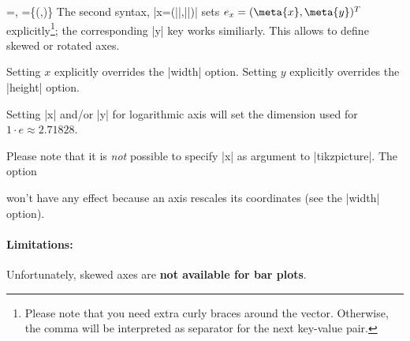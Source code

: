 \begin{pgfplotsxykeylist}{
	\x=,
	\x={\{(,)\}}}
The second syntax, |x={(||,||)}| sets $e_x = (\meta{x},\meta{y})^T$ explicitly\footnote{Please note that you need extra curly braces around the vector. Otherwise, the comma will be interpreted as separator for the next key-value pair.}; the corresponding |y| key works similiarly. This allows to define skewed or rotated axes.

\begin{codeexample}[]
\end{codeexample}

\begin{codeexample}[]
\end{codeexample}

	Setting $x$ explicitly overrides the |width| option. Setting $y$ explicitly overrides the |height| option.

	Setting |x| and/or |y| for logarithmic axis will set the dimension used for $1 \cdot e \approx 2.71828$.

	Please note that it is \emph{not} possible to specify |x| as argument to |tikzpicture|. The option 
\begin{codeexample}
\end{codeexample}
	won't have any effect because an axis rescales its coordinates (see the |width| option).

\paragraph{Limitations:} Unfortunately, skewed axes are \textbf{not available for bar plots}.
%
%
\end{pgfplotsxykeylist}

